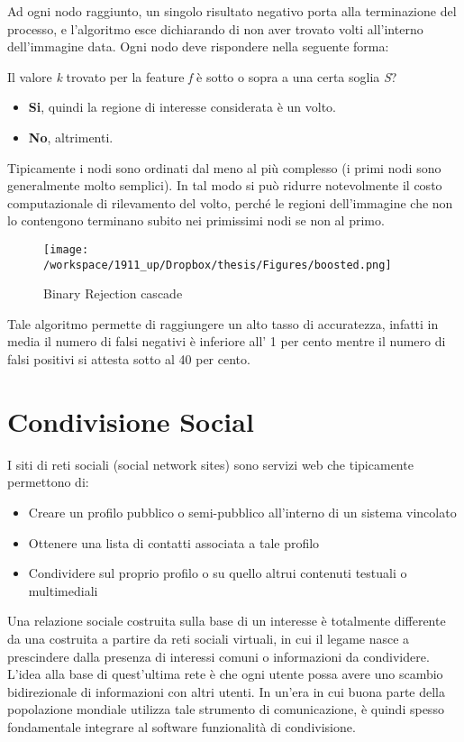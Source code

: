 Ad ogni nodo raggiunto, un singolo risultato negativo porta alla terminazione del processo, e l'algoritmo esce dichiarando di non aver trovato volti all'interno dell'immagine data. Ogni nodo deve rispondere nella seguente forma: 

Il valore \textit{k} trovato per la feature \textit{f} è sotto o sopra a una certa soglia \textit{S}? 
\begin{itemize}
\item \textbf{Si}, quindi la regione di interesse considerata è un volto.
\item \textbf{No}, altrimenti.
\end{itemize}

Tipicamente i nodi sono ordinati dal meno al più complesso (i primi nodi sono generalmente molto semplici). In tal modo si può ridurre notevolmente il costo computazionale di rilevamento del volto, perché le regioni dell'immagine che non lo contengono terminano subito nei primissimi nodi se non al primo.

\begin{figure}[H]\centering  
\texttt{[image: /workspace/1911\_up/Dropbox/thesis/Figures/boosted.png]}
\caption[Binary Rejection cascade]{Binary Rejection cascade}
\label{pic-a}
\end{figure}

Tale algoritmo permette di raggiungere un alto tasso di accuratezza, infatti in media il numero di falsi negativi è inferiore all' 1 per cento mentre il numero di falsi positivi si attesta sotto al 40 per cento.

\section{Condivisione Social}

I siti di reti sociali (social network sites) sono servizi web che tipicamente permettono di:
\begin{itemize}
\item Creare un profilo pubblico o semi-pubblico all'interno di un sistema vincolato
\item Ottenere una lista di contatti associata a tale profilo
\item Condividere sul proprio profilo o su quello altrui contenuti testuali o multimediali
\end{itemize}

Una relazione sociale costruita sulla base di un interesse è totalmente differente da una costruita a partire da reti sociali virtuali, in cui il legame nasce a prescindere dalla presenza di interessi comuni o informazioni da condividere.
L'idea alla base di quest'ultima rete è che ogni utente possa avere uno scambio bidirezionale di informazioni con altri utenti. In un'era in cui buona parte della popolazione mondiale utilizza tale strumento di comunicazione, è quindi spesso fondamentale integrare al software funzionalità di condivisione.

